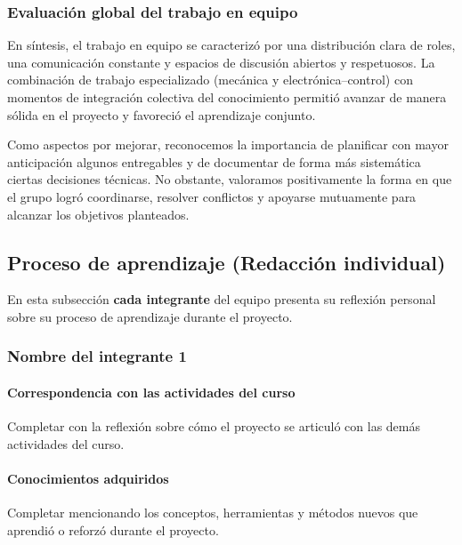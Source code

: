 \documentclass[11pt,a4paper]{article}
\begin{document}
\subsubsection*{Evaluación global del trabajo en equipo}

En síntesis, el trabajo en equipo se caracterizó por una distribución clara de roles, una comunicación
constante y espacios de discusión abiertos y respetuosos. La combinación de trabajo especializado
(mecánica y electrónica–control) con momentos de integración colectiva del conocimiento permitió avanzar
de manera sólida en el proyecto y favoreció el aprendizaje conjunto.

Como aspectos por mejorar, reconocemos la importancia de planificar con mayor anticipación algunos
entregables y de documentar de forma más sistemática ciertas decisiones técnicas. No obstante, valoramos
positivamente la forma en que el grupo logró coordinarse, resolver conflictos y apoyarse mutuamente para
alcanzar los objetivos planteados.


\subsection{Proceso de aprendizaje (Redacción individual)}
\label{subsec:proceso_aprendizaje}

En esta subsección \textbf{cada integrante} del equipo presenta su reflexión
personal sobre su proceso de aprendizaje durante el proyecto.

\subsubsection*{Nombre del integrante 1}


\paragraph{Correspondencia con las actividades del curso}

Completar con la reflexión sobre cómo el proyecto se articuló con las demás
actividades del curso.

\paragraph{Conocimientos adquiridos}

Completar mencionando los conceptos, herramientas y métodos nuevos que
aprendió o reforzó durante el proyecto.
\end{document}
